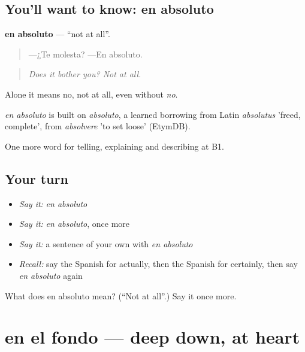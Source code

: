 \subsection*{You'll want to know: en absoluto}
\textbf{en absoluto} — \textquotedblleft{}not at all\textquotedblright{}.

\begin{quote}
—¿Te molesta? —En absoluto.
\end{quote}

\begin{quote}
\emph{Does it bother you? Not at all.}
\end{quote}

Alone it means no, not at all, even without \emph{no}.

\begin{cousinweb}
\emph{en absoluto} is built on \emph{absoluto}, a learned borrowing from Latin \emph{absolutus} 'freed, complete', from \emph{absolvere} 'to set loose' (EtymDB).
\end{cousinweb}

\begin{grammarlens}[title={What you've built}]
One more word for telling, explaining and describing at B1.
\end{grammarlens}

\subsection*{Your turn}
\begin{itemize}
\raggedright
  \item \emph{Say it:} \emph{en absoluto}
  \item \emph{Say it:} \emph{en absoluto}, once more
  \item \emph{Say it:} a sentence of your own with \emph{en absoluto}
  \item \emph{Recall:} say the Spanish for actually, then the Spanish for certainly, then say \emph{en absoluto} again
\end{itemize}

\begin{tcolorbox}[breakable,colback=teal!4,colframe=teal!35!black,title={Before you move on}]
What does en absoluto mean? (\textquotedblleft{}Not at all\textquotedblright{}.) Say it once more.
\end{tcolorbox}
\section[en el fondo]{en el fondo — deep down, at heart}

